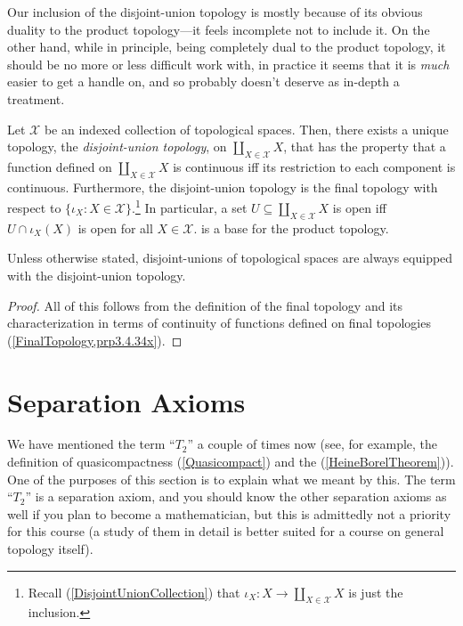 Our inclusion of the disjoint-union topology is mostly because of its obvious duality to the product topology---it feels incomplete not to include it.  On the other hand, while in principle, being completely dual to the product topology, it should be no more or less difficult work with, in practice it seems that it is \emph{much} easier to get a handle on, and so probably doesn't deserve as in-depth a treatment.
\begin{prp}\label{DisjointUnionTopology}
\begin{savenotes}
Let $\mathcal{X}$ be an indexed collection of topological spaces.  Then, there exists a unique topology, the \emph{disjoint-union topology}, on $\coprod _{X\in \mathcal{X}}X$, that has the property that a function defined on $\coprod _{X\in \mathcal{X}}X$ is continuous iff its restriction to each component is continuous.  Furthermore, the disjoint-union topology is the final topology with respect to $\{ \iota _X:X\in \mathcal{X}\}$.\footnote{Recall (\cref{DisjointUnionCollection}) that $\iota _X:X\rightarrow \coprod _{X\in \mathcal{X}}X$ is just the inclusion.}  In particular, a set $U\subseteq \coprod _{X\in \mathcal{X}}X$ is open iff $U\cap \iota _X(X)$ is open for all $X\in \mathcal{X}$.
is a base for the product topology.
\begin{rmk}
Unless otherwise stated, disjoint-unions of topological spaces are always equipped with the disjoint-union topology.
\end{rmk}
\begin{proof}
All of this follows from the definition of the final topology and its characterization in terms of continuity of functions defined on final topologies (\cref{FinalTopology,prp3.4.34x}).
\end{proof}
\end{savenotes}
\end{prp}

\section{Separation Axioms}\label{sct4.5}

We have mentioned the term ``$T_2$'' a couple of times now (see, for example, the definition of quasicompactness (\cref{Quasicompact}) and the  (\cref{HeineBorelTheorem})).  One of the purposes of this section is to explain what we meant by this.  The term ``$T_2$'' is a separation axiom, and you should know the other separation axioms as well if you plan to become a mathematician, but this is admittedly not a priority for this course (a study of them in detail is better suited for a course on general topology itself).

